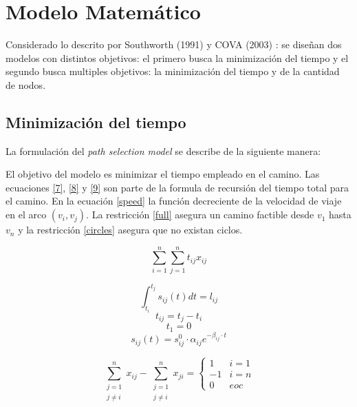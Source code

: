 \documentclass[letter, 10pt]{article}
\begin{document}
\section{Modelo Matem\'atico}
Considerado lo descrito por Southworth (1991) \cite{southworth1991regional} y COVA (2003) \cite{cova2003network}: se diseñan dos modelos con distintos objetivos: el primero busca la minimización del tiempo y el segundo busca multiples objetivos: la minimización del tiempo y de la cantidad de nodos.


\subsection{Minimización del tiempo} 

La formulación del \textit{path selection model} se describe de la siguiente manera:

El objetivo del modelo es minimizar el tiempo empleado en el camino. Las ecuaciones \eqref{7}, \eqref{8} y \eqref{9} son parte de la formula de recursión del tiempo total para el camino. En la ecuación \eqref{speed} la función decreciente de la velocidad de viaje en el arco $(v_i,v_j)$. La restricción \eqref{full} asegura un camino factible desde $v_1$ hasta $v_n$ y la restricción \eqref{circles} asegura que no existan ciclos.

\begin{equation}
	 \sum_{i=1}^{n}\sum_{j=1}^{n} t_{ij}x_{ij}
\end{equation}

\begin{equation}\label{7}
  \int_{t_i}^{t_j} s_{ij}(t)dt = l_{ij}
\end{equation}
\begin{equation}\label{8}
  t_{ij} = t_j - t_i
\end{equation}
\begin{equation}\label{9}
t_1 =0
\end{equation}
\begin{equation}\label{speed}
  s_{ij}(t) = s_{ij}^0 \cdot \alpha_{ij} e^{-\beta_{ij}\cdot t}
\end{equation}

\begin{equation}\label{full}
	\sum_{\substack{j=1\\
                  j \neq i}}^n x_{ij} - \sum_{\substack{j=1\\
                  j \neq i}}^{n} x_{ji} = \begin{cases}
1 & i=1\\
-1 & i=n \\
0 & eoc
\end{cases}
\end{equation}
\end{document}
